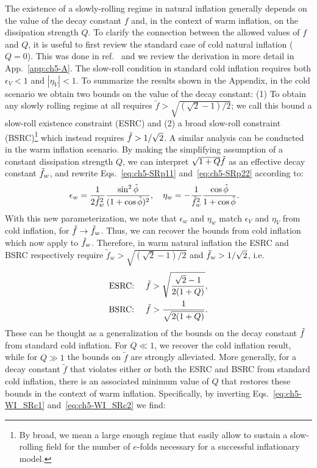 The existence of a slowly-rolling regime in natural inflation generally depends on the value of the decay constant $f$ and, in the context of warm inflation, on the dissipation strength $Q$. To clarify the connection between the allowed values of $f$ and $Q$, it is useful to first review the standard case of cold natural inflation ($Q=0$). This was done in ref.~\cite{Freese:2004un} and we review the derivation in more detail in App.~\ref{app:ch5-A}.
The slow-roll condition in standard cold inflation requires  both $\epsilon_V < 1$ and $|\eta_V| < 1$.
To summarize the results shown in the Appendix, in the cold scenario we obtain two bounds on the value of the decay constant:
(1) To obtain any slowly rolling regime at all requires $\tilde{f}>\sqrt{(\sqrt{2}-1)/2}$; we call this bound a slow-roll existence constraint (ESRC) and (2) a broad slow-roll constraint (BSRC)\footnote{By broad, we mean a large enough regime that easily allow to sustain a slow-rolling field for the number of $e$-folds necessary for a successful inflationary model.} which instead requires $\Tilde{f}>1/\sqrt{2}$. A similar analysis can be conducted in the warm inflation scenario. By making the simplifying assumption of a constant dissipation strength $Q$, we can interpret $\sqrt{1+Q}\Tilde{f}$ as an effective decay constant $\Tilde{f}_w$, and rewrite Eqs.~\ref{eq:ch5-SRp11} and~\ref{eq:ch5-SRp22} according to:
\begin{align}
\epsilon_{w}&= \frac{1}{2\Tilde{f}_w^2}\frac{\sin ^{2} \Tilde{\phi}}{(1+\cos \Tilde{\phi})^{2}}, \quad
\eta_{w}=-\frac{1}{\Tilde{f}_w^2}  \frac{\cos\Tilde{\phi} }{1+\cos \Tilde{\phi}}.
\end{align}
With this new parameterization, we note that $\epsilon_w$ and $\eta_w$ match $\epsilon_V$ and $\eta_V$ from cold inflation, for $\Tilde{f} \to \Tilde{f}_w$. Thus, we can recover the bounds from cold inflation which now apply to $\Tilde{f}_w$. Therefore, in warm natural inflation
the ESRC and BSRC respectively require $\tilde{f}_w>\sqrt{(\sqrt{2}-1)/2}$ and $\Tilde{f}_w>1/\sqrt{2}$, i.e.
\begin{align}
    \text{ESRC: }\quad \Tilde{f}&>\sqrt{\frac{\sqrt{2}-1}{2(1+Q)}}, \label{eq:ch5-WI_SRc1}\\
    \text{BSRC: }\quad \Tilde{f}&>\frac{1}{\sqrt{2(1+Q)}}.  \label{eq:ch5-WI_SRc2}
\end{align}
These can be thought as a generalization of the bounds on the decay constant $\Tilde{f}$ from standard cold inflation. For $Q \ll 1$, we recover the cold inflation result, while for $Q\gg 1$ the bounds on $\tilde{f}$ are strongly alleviated. More generally, for a decay constant $\tilde{f}$ that violates either or both the ESRC and BSRC from standard cold inflation, there is an associated minimum value of $Q$ that restores these bounds in the context of warm inflation. Specifically, by inverting Eqs.~\ref{eq:ch5-WI_SRc1} and~\ref{eq:ch5-WI_SRc2} we find:
